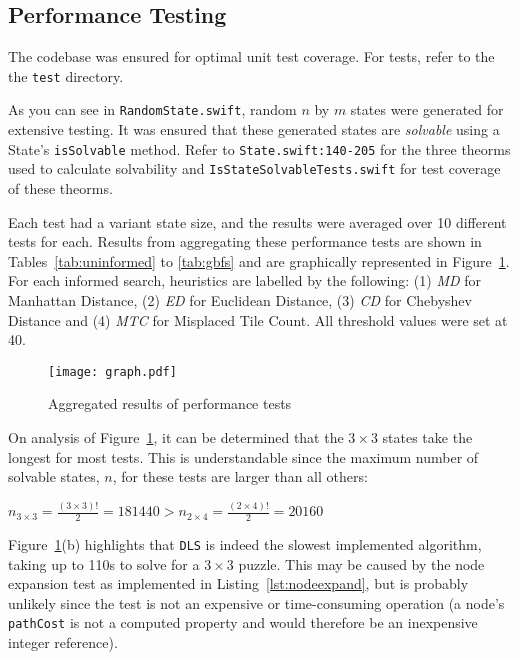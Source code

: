 \subsection{Performance Testing}
\label{sub:randomstategeneration}

The codebase was ensured for optimal unit test coverage. For tests, refer to
the the \texttt{test} directory.

As you can see in \texttt{RandomState.swift}, random $n$ by $m$ states were
generated for extensive testing. It was ensured that these generated states are
\emph{solvable} using a State's \texttt{isSolvable} method. Refer to
\texttt{State.swift:140-205} for the three theorms used to calculate solvability
and \texttt{IsStateSolvableTests.swift} for test coverage of these theorms.

Each test had a variant state size, and the results were averaged over 10
different tests for each. Results from aggregating these performance tests are
shown in Tables~\ref{tab:uninformed} to \ref{tab:gbfs} and are graphically
represented in Figure~\ref{fig:results}. For each informed search, heuristics
are labelled by the following: (1) \emph{MD} for Manhattan Distance, (2)
\emph{ED} for Euclidean Distance, (3) \emph{CD} for Chebyshev Distance and
(4) \emph{MTC} for Misplaced Tile Count. All threshold values were set at 40.

\begin{figure}[h!]
  \centering
  \texttt{[image: graph.pdf]}
  \caption{Aggregated results of performance tests}
  \label{fig:results}
\end{figure}

On analysis of Figure~\ref{fig:results}, it can be determined that the $3 \times 3$
states take the longest for most tests. This is understandable since the maximum
number of solvable states, $n$, for these tests are larger than all others:


\begin{center}
  \vspace{0.5em}
  \noindent
  $n_{3 \times 3} = \frac{( 3 \times 3 )!}{2} = 181440 > n_{2 \times 4} = \frac{( 2 \times 4 )!}{2} = 20160$
  \vspace{0.5em}
\end{center}

Figure~\ref{fig:results}(b) highlights that \texttt{DLS} is indeed the slowest
implemented algorithm, taking up to 110s to solve for a $3 \times 3$ puzzle. This
may be caused by the node expansion test as implemented in Listing~\ref{lst:nodeexpand},
but is probably unlikely since the test is not an expensive or time-consuming
operation (a node's \texttt{pathCost} is not a computed property and would therefore
be an inexpensive integer reference).


